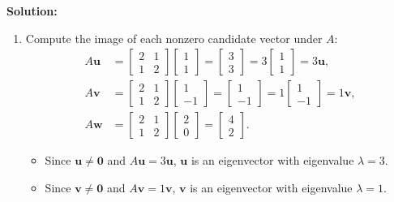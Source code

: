 \documentclass[11pt, letterpaper]{article}
\theoremstyle{definition}
\theoremstyle{remark}
\begin{document}
\textbf{Solution:}
\begin{enumerate}[label=(\alph*)]
    \item Compute the image of each nonzero candidate vector under $A$:
    \begin{align*}
    A\mathbf{u} &= \begin{bmatrix} 2 & 1 \\ 1 & 2 \end{bmatrix}\begin{bmatrix} 1 \\ 1 \end{bmatrix} = \begin{bmatrix} 3 \\ 3 \end{bmatrix} = 3\begin{bmatrix} 1 \\ 1 \end{bmatrix} = 3\mathbf{u}, \\
    A\mathbf{v} &= \begin{bmatrix} 2 & 1 \\ 1 & 2 \end{bmatrix}\begin{bmatrix} 1 \\ -1 \end{bmatrix} = \begin{bmatrix} 1 \\ -1 \end{bmatrix} = 1\begin{bmatrix} 1 \\ -1 \end{bmatrix} = 1\mathbf{v}, \\
    A\mathbf{w} &= \begin{bmatrix} 2 & 1 \\ 1 & 2 \end{bmatrix}\begin{bmatrix} 2 \\ 0 \end{bmatrix} = \begin{bmatrix} 4 \\ 2 \end{bmatrix}.
    \end{align*}
    \begin{itemize}
        \item Since $\mathbf{u} \neq \mathbf{0}$ and $A\mathbf{u} = 3\mathbf{u}$, $\mathbf{u}$ is an eigenvector with eigenvalue $\lambda = 3$.
        \item Since $\mathbf{v} \neq \mathbf{0}$ and $A\mathbf{v} = 1\mathbf{v}$, $\mathbf{v}$ is an eigenvector with eigenvalue $\lambda = 1$.

\end{itemize}
\end{enumerate}
\end{document}
